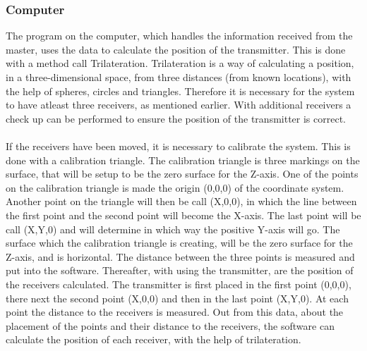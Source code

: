 \subsubsection{Computer}
The program on the computer, which handles the information received from the master, uses the data to calculate the position of the transmitter. This is done with a method call Trilateration. Trilateration is a way of calculating a position, in a three-dimensional space, from three distances (from known locations), with the help of spheres, circles and triangles. Therefore it is necessary for the system to have atleast three receivers, as mentioned earlier. With additional receivers a check up can be performed to ensure the position of the transmitter is correct.\\\\

If the receivers have been moved, it is necessary to calibrate the system. This is done with a calibration triangle. The calibration triangle is three markings on the surface, that will be setup to be the zero surface for the Z-axis. One of the points on the calibration triangle is made the origin (0,0,0) of the coordinate system. Another point on the triangle will then be call (X,0,0), in which the line between the first point and the second point will become the X-axis. The last point will be call (X,Y,0) and will determine in which way the positive Y-axis will go. The surface which the calibration triangle is creating, will be the zero surface for the Z-axis, and is horizontal. The distance between the three points is measured and put into the software. Thereafter, with using the transmitter, are the position of the receivers calculated.  The transmitter is first placed in the first point (0,0,0), there next the second point (X,0,0) and then in the last point (X,Y,0). At each point the distance to the receivers is measured. Out from this data, about the placement of the points and their distance to the receivers, the software can calculate the position of each receiver, with the help of trilateration. \\\\


